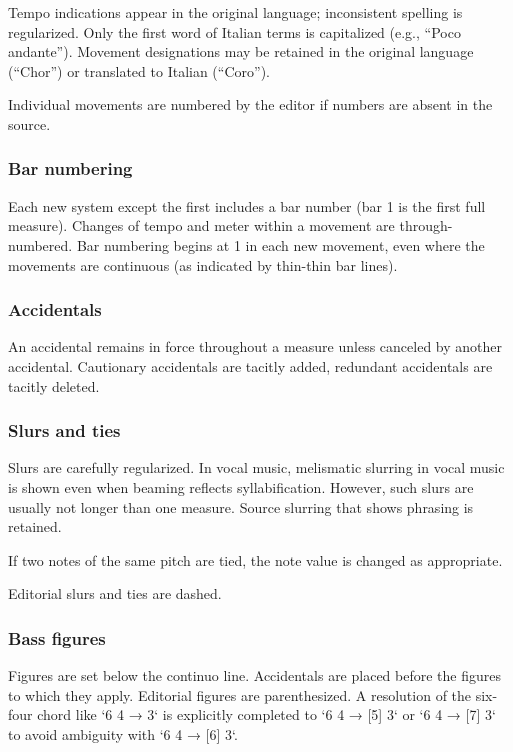 \documentclass{ees}
\begin{document}
Tempo indications appear in the original language; inconsistent spelling is regularized. Only the first word of Italian terms is capitalized (e.g., “Poco andante”). Movement designations may be retained in the original language (“Chor”) or translated to Italian (“Coro”).

Individual movements are numbered by the editor if numbers are absent in the source.


\subsubsection{Bar numbering}

Each new system except the first includes a bar number (bar 1 is the first full measure). Changes of tempo and meter within a movement are through-numbered. Bar numbering begins at 1 in each new movement, even where the movements are continuous (as indicated by thin-thin bar lines).


\subsubsection{Accidentals}

An accidental remains in force throughout a measure unless canceled by another accidental. Cautionary accidentals are tacitly added, redundant accidentals are tacitly deleted.


\subsubsection{Slurs and ties}

Slurs are carefully regularized. In vocal music, melismatic slurring in vocal music is shown even when beaming reflects syllabification. However, such slurs are usually not longer than one measure. Source slurring that shows phrasing is retained.

If two notes of the same pitch are tied, the note value is changed as appropriate.

Editorial slurs and ties are dashed.


\subsubsection{Bass figures}

Figures are set below the continuo line. Accidentals are placed before the figures to which they apply. Editorial figures are parenthesized. A resolution of the six-four chord like `6 4 → 3` is explicitly completed to `6 4 → [5] 3` or `6 4 → [7] 3` to avoid ambiguity with `6 4 → [6] 3`.
\end{document}
